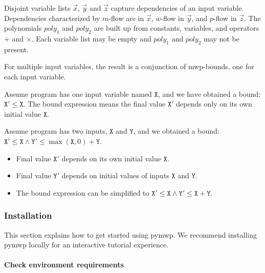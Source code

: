 Disjoint variable lists \(\vec x\), \(\vec y\) and \(\vec z\) capture dependencies of an input variable.
Dependencies characterized by \(m\)-flow are in \(\vec x\), \(w\)-flow in \(\vec y\), and \(p\)-flow in \(\vec z\).
The polynomials \(poly_1\) and \(poly_2\) are built up from constants, variables, and operators \(+\) and \(\times\).
Each variable list may be empty and \(poly_1\) and \(poly_2\) may not be present.

For multiple input variables, the result is a conjunction of mwp-bounds, one for each input variable.

\begin{example}
    Assume program has one input variable named \(\texttt{X}\), and we have obtained a bound: \(\texttt{X}' \leq \texttt{X}\).
    The bound expression means the final value \(\texttt{X}'\) depends only on its own initial value \(\texttt{X}\).
\end{example}

\begin{example}
    Assume program has two inputs, \(\texttt{X}\) and \(\texttt{Y}\), and we obtained a bound:
    \(\texttt{X}' \leq \texttt{X} \land \texttt{Y}' \leq \max(\texttt{X}, 0) + \texttt{Y}\).
\end{example}

\begin{itemize}
    \item Final value \(\texttt{X}'\) depends on its own initial value \(\texttt{X}\).
    \item Final value \(\texttt{Y}'\) depends on initial values of inputs \(\texttt{X}\) and \(\texttt{Y}\).
    \item The bound expression can be simplified to \(\texttt{X}' \leq \texttt{X} \land \texttt{Y}' \leq \texttt{X} + \texttt{Y}\).
\end{itemize}


\subsubsection{Installation}\label{guide-install}

This section explains how to get started using pymwp.
We recommend installing pymwp locally for an interactive tutorial experience.

\paragraph{Check environment requirements}

